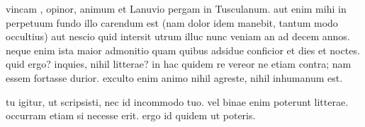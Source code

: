 


 vincam , opinor, animum et Lanuvio pergam in Tusculanum. aut enim mihi in perpetuum fundo illo carendum est (nam dolor idem manebit, tantum modo occultius) aut nescio quid intersit utrum illuc nunc veniam an ad decem annos. neque enim ista maior admonitio quam quibus adsidue conficior et dies et noctes. quid ergo? inquies, nihil litterae? in hac quidem re vereor ne etiam contra; nam essem fortasse durior. exculto enim animo nihil agreste, nihil inhumanum est.

 tu igitur, ut scripsisti, nec id incommodo tuo. vel binae enim poterunt litterae. occurram etiam si necesse erit. ergo id quidem ut poteris.
